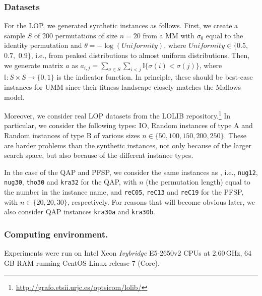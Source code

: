 \documentclass[runningheads]{llncs}
\begin{document}
\subsubsection{Datasets}
%
For the LOP, we generated synthetic instances as follows. First, we create a sample $S$ of 200 permutations of size $n=20$ from a MM with $\sigma_0$ equal to the identity permutation and $\theta=-\log(\textit{Uniformity})$, where  $\textit{Uniformity}\in\{0.5,$ $0.7,$ $0.9\}$, i.e., from peaked distributions to almost uniform distributions. Then, we generate matrix $a$ as $a_{i,j} = \sum_{\sigma\in S}\sum_{i<j}\mathbb{I}\{\sigma(i)<\sigma(j)\}$, where ${\mathbb{I}\colon S \times S \to \{0,1\}}$ is the indicator function. In principle, these should be best-case instances for UMM since their fitness landscape closely matches the Mallows model.%

Moreover, we consider real LOP datasets from the LOLIB
repository.\footnote{\url{http://grafo.etsii.urjc.es/optsicom/lolib/}} In
particular, we consider the following types: IO, Random instances of type A and
Random instances of type B of various sizes $n \in \{50, 100, 150, 200,
250\}$. These are harder problems than the synthetic instances, not only
because of the larger search space, but also because of the different instance
types.

In the case of the QAP and PFSP, we consider the same instances as
\citet{ZaeStoFriFisNauBar2014,ZaeStoBar2014:ppsn}, i.e., \texttt{nug12},
\texttt{nug30}, \texttt{tho30} and \texttt{kra32} for the QAP, with $n$ (the
permutation length) equal to the number in the instance name, and
\texttt{reC05}, \texttt{reC13} and \texttt{reC19} for the PFSP, with
$n \in \{20, 20, 30\}$, respectively. For reasons that will become obvious
later, we also consider QAP instances \texttt{kra30a} and \texttt{kra30b}.

\subsubsection{Computing environment.}
Experiments were run on Intel Xeon \emph{Ivybridge} E5-2650v2 CPUs at
2.60\,GHz, 64\,GB RAM running CentOS Linux release 7 (Core).
\end{document}
